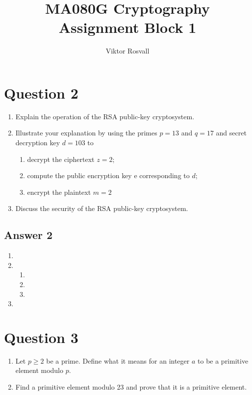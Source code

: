 \documentclass{article}
\title{MA080G Cryptography Assignment Block 1}
\author{Viktor Rosvall}
\begin{document}
	\maketitle
	
	\section*{Question 2}
	\renewcommand{\theenumi}{\alph{enumi}}
	\renewcommand{\theenumii}{\roman{enumii}}
	\begin{enumerate}
		\item Explain the operation of the RSA public-key cryptosystem.
		
		\item Illustrate your explanation by using the primes $p = 13$ and $q = 17$ and secret decryption key $d = 103$ to
		\begin{enumerate}
			\item  decrypt the ciphertext $z = 2$;
			\item compute the public encryption key e corresponding to $d$;
			\item  encrypt the plaintext $m = 2$
  		\end{enumerate}
  	
  	\item Discuss the security of the RSA public-key cryptosystem.
	\end{enumerate}	

	\subsection*{Answer 2}
	\renewcommand{\theenumi}{\alph{enumi}}
	\renewcommand{\theenumii}{\roman{enumii}}
	\begin{enumerate}
		\item 
		
		\item 
		\begin{enumerate}
			\item  
			\item 
			\item  
		\end{enumerate}
		
		\item 
	\end{enumerate}	



	\section*{Question 3}
	\renewcommand{\theenumi}{\alph{enumi}}
	\begin{enumerate}
		\item Let $p \ge 2$ be a prime. Define what it means for an integer $a$ to be a primitive element modulo $p$.
		
		\item Find a primitive element modulo 23 and prove that it is a primitive element.
	\end{enumerate}	
\end{document}
